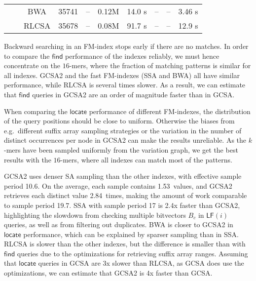 \documentclass[twoside,leqno,twocolumn]{article}
\newcommand{\LF}{\ensuremath{\mathsf{LF}}}
\newcommand{\find}{\ensuremath{\mathsf{find}}}
\newcommand{\locate}{\ensuremath{\mathsf{locate}}}
\newcommand{\parent}{\ensuremath{\mathsf{parent}}}
\newcommand{\countq}{\ensuremath{\mathsf{count}}}
\newcommand{\kmer}[1]{$#1$\nobreakdash-mer}
\newcommand{\orderk}[1]{order\nobreakdash-$#1$}
\begin{document}
\begin{table*}[t]
\begin{center}
\begin{tabular}{cc|cccc|cccc}
     &        & BWA   &  35741 &    -- & 0.12M & 14.0 \textmu{}s &              -- &              -- & 3.46 \textmu{}s \\
     &        & RLCSA &  35678 &    -- & 0.08M & 91.7 \textmu{}s &              -- &              -- & 12.9 \textmu{}s \\
\hline
\end{tabular}
\caption{Query benchmarks using an \orderk{128} GCSA2 and various FM\nobreakdash-indexes. Pattern length; number of patterns; index type; number matching patterns, matching nodes, and distinct occurrences; average time for $[sp, ep] = \find(X)$, $\parent(sp, ep)$, and $\countq(sp, ep)$ queries in microseconds; and average time per value for $\locate(sp, ep)$ queries in microseconds.}\label{table:benchmark}
\end{center}
\end{table*}

Backward searching in an FM-index stops early if there are no matches. In order to compare the $\find$ performance of the indexes reliably, we must hence concentrate on the \kmer{16}s, where the fraction of matching patterns is similar for all indexes. GCSA2 and the fast FM-indexes (SSA and BWA) all have similar performance, while RLCSA is several times slower. As a result, we can estimate that $\find$ queries in GCSA2 are an order of magnitude faster than in GCSA.

When comparing the $\locate$ performance of different FM-indexes, the distribution of the query positions should be close to uniform. Otherwise the biases from e.g.~different suffix array sampling strategies or the variation in the number of distinct occurrences per node in GCSA2 can make the results unreliable. As the \kmer{k}s have been sampled uniformly from the variation graph, we get the best results with the \kmer{16}s, where all indexes can match most of the patterns.

GCSA2 uses denser SA sampling than the other indexes, with effective sample period 10.6. On the average, each sample contains 1.53~values, and GCSA2 retrieves each distinct value 2.84~times, making the amount of work comparable to sample period 19.7. SSA with sample period 17 is 2.4x faster than GCSA2, highlighting the slowdown from checking multiple bitvectors $B_{c}$ in $\LF(i)$ queries, as well as from filtering out duplicates. BWA is closer to GCSA2 in $\locate$ performance, which can be explained by sparser sampling than in SSA. RLCSA is slower than the other indexes, but the difference is smaller than with $\find$ queries due to the optimizations for retrieving suffix array ranges. Assuming that $\locate$ queries in GCSA are 3x slower than RLCSA, as GCSA does use the optimizations, we can estimate that GCSA2 is 4x faster than GCSA.
\end{document}
